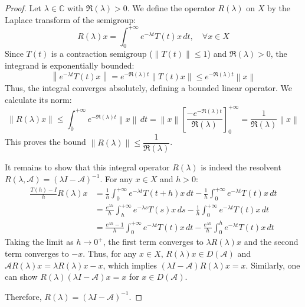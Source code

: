 \documentclass[12pt, oneside]{book}
\newcommand{\norm}[1]{\left\lVert#1\right\rVert}
\newcommand{\A}{\mathscr{A}}
\begin{document}
\begin{proof}
Let $\lambda \in \mathbb{C}$ with $\Re(\lambda) > 0$. We define the operator $R(\lambda)$ on $X$ by the Laplace transform of the semigroup:
$$
R(\lambda)x = \int_0^{+\infty} e^{-\lambda t} T(t)x \, dt, \quad \forall x \in X
$$
Since $T(t)$ is a contraction semigroup ($\|T(t)\| \le 1$) and $\Re(\lambda) > 0$, the integrand is exponentially bounded:
$$
\norm{e^{-\lambda t} T(t)x} = e^{-\Re(\lambda)t} \norm{T(t)x} \le e^{-\Re(\lambda)t} \norm{x}
$$
Thus, the integral converges absolutely, defining a bounded linear operator. We calculate its norm:
$$
\norm{R(\lambda)x} \le \int_0^{+\infty} e^{-\Re(\lambda)t} \norm{x} \, dt = \norm{x} \left[ \frac{-e^{-\Re(\lambda)t}}{\Re(\lambda)} \right]_0^{+\infty} = \frac{1}{\Re(\lambda)} \norm{x}
$$
This proves the bound $\|R(\lambda)\| \le \dfrac{1}{\Re(\lambda)}$.

It remains to show that this integral operator $R(\lambda)$ is indeed the resolvent ${R(\lambda, \A) = (\lambda I - \A)^{-1}}$.
For any $x \in X$ and $h > 0$:
\begin{align*}
	\frac{T(h) - I}{h} R(\lambda)x &= \frac{1}{h} \int_0^{+\infty} e^{-\lambda t} T(t+h)x \, dt - \frac{1}{h} \int_0^{+\infty} e^{-\lambda t} T(t)x \, dt \\
				       &= \frac{e^{\lambda h}}{h} \int_h^{+\infty} e^{-\lambda s} T(s)x \, ds - \frac{1}{h} \int_0^{+\infty} e^{-\lambda t} T(t)x \, dt \\
				       &= \frac{e^{\lambda h} - 1}{h} \int_0^{+\infty} e^{-\lambda t} T(t)x \, dt - \frac{e^{\lambda h}}{h} \int_0^h e^{-\lambda t} T(t)x \, dt
\end{align*}
Taking the limit as $h \to 0^+$, the first term converges to $\lambda R(\lambda)x$ and the second term converges to $-x$.
Thus, for any $x \in X$, $R(\lambda)x \in D(\A)$ and $\A R(\lambda)x = \lambda R(\lambda)x - x$, which implies $(\lambda I - \A)R(\lambda)x = x$. Similarly, one can show $R(\lambda)(\lambda I - \A)x = x$ for $x \in D(\A)$.

Therefore, $R(\lambda) = (\lambda I - \A)^{-1}$.
\end{proof}
\end{document}
